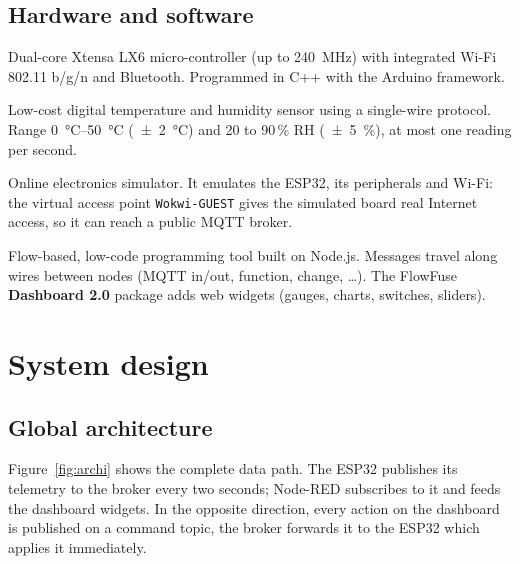 \documentclass[11pt,a4paper]{article}
\begin{document}
\subsection{Hardware and software}
\begin{description}[style=nextline,leftmargin=1.2em]
  \item[ESP32] Dual-core Xtensa LX6 micro-controller (up to \SI{240}{MHz}) with integrated
        Wi-Fi 802.11 b/g/n and Bluetooth. Programmed in C++ with the Arduino framework.
  \item[DHT11] Low-cost digital temperature and humidity sensor using a single-wire protocol.
        Range \SIrange{0}{50}{\celsius} (\SI{\pm 2}{\celsius}) and 20 to 90\,\% RH
        (\SI{\pm 5}{\percent}), at most one reading per second.
  \item[Wokwi] Online electronics simulator. It emulates the ESP32, its peripherals and Wi-Fi:
        the virtual access point \texttt{Wokwi-GUEST} gives the simulated board real Internet
        access, so it can reach a public MQTT broker.
  \item[Node-RED] Flow-based, low-code programming tool built on Node.js. Messages travel along
        wires between nodes (MQTT in/out, function, change, \dots). The FlowFuse
        \textbf{Dashboard 2.0} package adds web widgets (gauges, charts, switches, sliders).
\end{description}

\section{System design}

\subsection{Global architecture}
Figure~\ref{fig:archi} shows the complete data path. The ESP32 publishes its telemetry to the
broker every two seconds; Node-RED subscribes to it and feeds the dashboard widgets. In the
opposite direction, every action on the dashboard is published on a command topic, the broker
forwards it to the ESP32 which applies it immediately.
\end{document}
